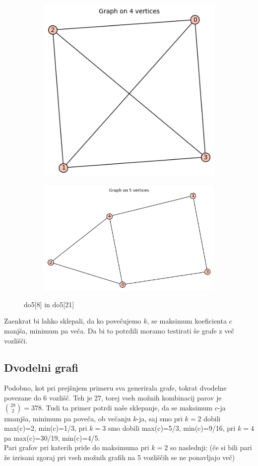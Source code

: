 \documentclass[12pt, a4paper]{article}
\begin{document}
\begin{center}
\begin{figure}[!htb]
\centering
\begin{subfigure}{0.5\textwidth}
  \centering
  \includegraphics[width=0.5\linewidth]{do5[8]}
\end{subfigure}%
\begin{subfigure}{0.5\textwidth}
  \centering
  \includegraphics[width=0.9\linewidth]{do5[21]}
\end{subfigure}
\caption{do5[8] in do5[21]}
\label{fig:test}
\end{figure}
\end{center}
Zaenkrat bi lahko sklepali, da ko povečujemo $k$, se maksimum koeficienta $c$ manjša, minimum pa veča. Da bi to potrdili moramo testirati še grafe z več vozlišči. \\

\subsection{Dvodelni grafi}
Podobno, kot pri prejšnjem primeru sva generirala grafe, tokrat dvodelne povezane do 6 vozlišč. Teh je 27, torej vseh možnih kombinacij parov je $\binom{28}{2}=378$. Tudi ta primer potrdi naše sklepanje, da se maksimum $c$-ja zmanjša, minimum pa poveča, ob večanju $k$-ja, saj smo pri $k=2$ dobili max(c)=2, min(c)=1/3, pri $k=3$ smo dobili max(c)=5/3, min(c)=9/16, pri $k=4$ pa max(c)=30/19, min(c)=4/5. \\
Pari grafov pri katerih pride do maksimuma pri $k=2$ so naslednji:
(če si bili pari že izrisani zgoraj pri vseh možnih grafih na 5 vozliščih se ne ponavljajo več)
\end{document}
